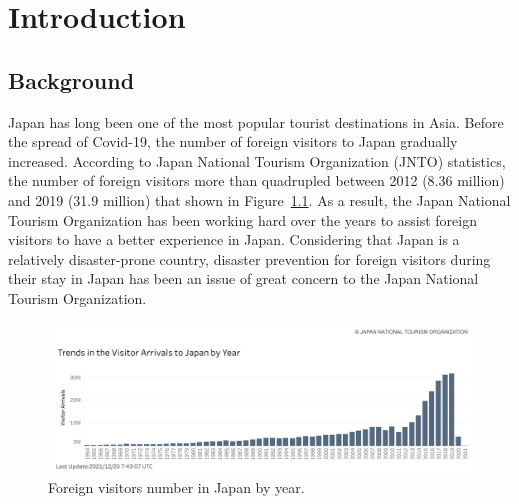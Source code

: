 \chapter{Introduction}

\section{Background}
Japan has long been one of the most popular tourist destinations in Asia. Before the spread of Covid-19, the number of foreign visitors to Japan gradually increased. According to Japan National Tourism Organization (JNTO) statistics, the number of foreign visitors more than quadrupled between 2012 (8.36 million) and 2019 (31.9 million) that shown in Figure~\ref{fig1}. As a result, the Japan National Tourism Organization has been working hard over the years to assist foreign visitors to have a better experience in Japan. Considering that Japan is a relatively disaster-prone country, disaster prevention for foreign visitors during their stay in Japan has been an issue of great concern to the Japan National Tourism Organization.

\begin{figure}[h]
  \includegraphics[width=\linewidth]{Figure/Figure1.png}
  \centering
  \caption[Foreign visitors number in Japan by year.]{Foreign visitors number in Japan by year.\protect\footnotemark }
  \label{fig1}
\end{figure}

